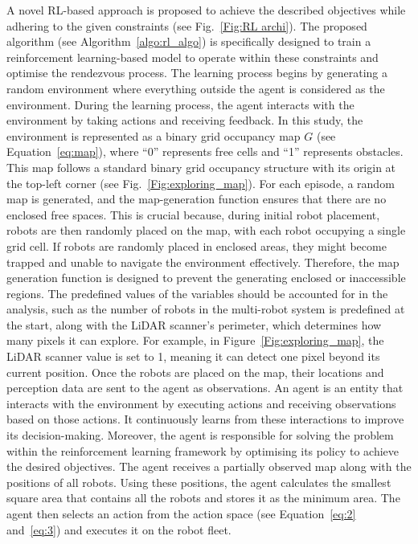 \documentclass[journal]{IEEEtran}
\begin{document}
\textcolor{green!60!black}{A novel RL-based approach is proposed to achieve the described objectives while adhering to the given constraints (see Fig.~\ref{Fig:RL archi}). The proposed algorithm (see Algorithm~\ref{algo:rl_algo}) is specifically designed to train a reinforcement learning-based model to operate within these constraints and optimise the rendezvous process. The learning process begins by generating a random environment where everything outside the agent is considered as the environment. During the learning process, the agent interacts with the environment by taking actions and receiving feedback. In this study, the environment is represented as a binary grid occupancy map $G$ (see Equation~\ref{eq:map}), where ``0'' represents free cells and ``1'' represents obstacles. This map follows a standard binary grid occupancy structure with its origin at the top-left corner (see Fig.~\ref{Fig:exploring_map}). For each episode, a random map is generated, and the map-generation function ensures that there are no enclosed free spaces. This is crucial because, during initial robot placement, robots are then randomly placed on the map, with each robot occupying a single grid cell. If robots are randomly placed in enclosed areas, they might become trapped and unable to navigate the environment effectively. Therefore, the map generation function is designed to prevent the generating enclosed or inaccessible regions. The predefined values of the variables should be accounted for in the analysis, such as the number of robots in the multi-robot system is predefined at the start, along with the LiDAR scanner's perimeter, which determines how many pixels it can explore. For example, in Figure~\ref{Fig:exploring_map}, the LiDAR scanner value is set to 1, meaning it can detect one pixel beyond its current position. Once the robots are placed on the map, their locations and perception data are sent to the agent as observations. An agent is an entity that interacts with the environment by executing actions and receiving observations based on those actions. It continuously learns from these interactions to improve its decision-making. Moreover, the agent is responsible for solving the problem within the reinforcement learning framework by optimising its policy to achieve the desired objectives. The agent receives a partially observed map along with the positions of all robots. Using these positions, the agent calculates the smallest square area that contains all the robots and stores it as the minimum area. The agent then selects an action from the action space (see Equation~\ref{eq:2} and~\ref{eq:3}) and executes it on the robot fleet.}
\end{document}
